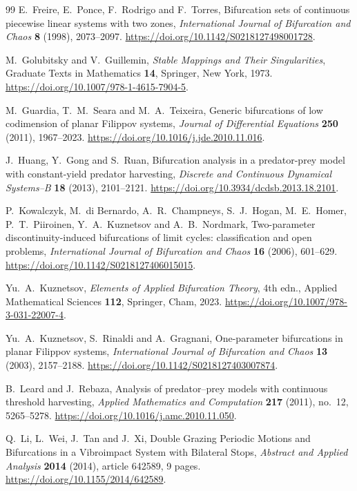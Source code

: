 \begin{thebibliography}{99}
E.~Freire, E.~Ponce, F.~Rodrigo and F.~Torres,
Bifurcation sets of continuous piecewise linear systems with two zones,
\emph{International Journal of Bifurcation and Chaos}
\textbf{8} (1998), 2073--2097.
\url{https://doi.org/10.1142/S0218127498001728}.

M.~Golubitsky and V.~Guillemin,
\emph{Stable Mappings and Their Singularities},
Graduate Texts in Mathematics \textbf{14}, Springer, New York, 1973.
\url{https://doi.org/10.1007/978-1-4615-7904-5}.

M.~Guardia, T.~M.~Seara and M.~A.~Teixeira,
Generic bifurcations of low codimension of planar Filippov systems,
\emph{Journal of Differential Equations} \textbf{250} (2011), 1967--2023.
\url{https://doi.org/10.1016/j.jde.2010.11.016}.

J.~Huang, Y.~Gong and S.~Ruan,
Bifurcation analysis in a predator-prey model with constant-yield
predator harvesting,
\emph{Discrete and Continuous Dynamical Systems--B}
\textbf{18} (2013), 2101--2121.
\url{https://doi.org/10.3934/dcdsb.2013.18.2101}.

P.~Kowalczyk, M.~di Bernardo, A.~R.~Champneys, S.~J.~Hogan,
M.~E.~Homer, P.~T.~Piiroinen, Y.~A.~Kuznetsov and A.~B.~Nordmark,
Two-parameter discontinuity-induced bifurcations of limit cycles:
classification and open problems,
\emph{International Journal of Bifurcation and Chaos}
\textbf{16} (2006), 601--629.
\url{https://doi.org/10.1142/S0218127406015015}.

Yu.~A.~Kuznetsov,
\emph{Elements of Applied Bifurcation Theory}, 4th edn.,
Applied Mathematical Sciences \textbf{112}, Springer, Cham, 2023.
\url{https://doi.org/10.1007/978-3-031-22007-4}.

Yu.~A.~Kuznetsov, S.~Rinaldi and A.~Gragnani,
One-parameter bifurcations in planar Filippov systems,
\emph{International Journal of Bifurcation and Chaos}
\textbf{13} (2003), 2157--2188.
\url{https://doi.org/10.1142/S0218127403007874}.

B.~Leard and J.~Rebaza,
Analysis of predator--prey models with continuous threshold harvesting,
\emph{Applied Mathematics and Computation} \textbf{217} (2011), no.~12,
5265--5278.
\url{https://doi.org/10.1016/j.amc.2010.11.050}.

Q.~Li, L.~Wei, J.~Tan and J.~Xi,
Double Grazing Periodic Motions and Bifurcations in a Vibroimpact System
with Bilateral Stops,
\emph{Abstract and Applied Analysis}
\textbf{2014} (2014), article 642589, 9 pages.
\url{https://doi.org/10.1155/2014/642589}.


\end{thebibliography}
